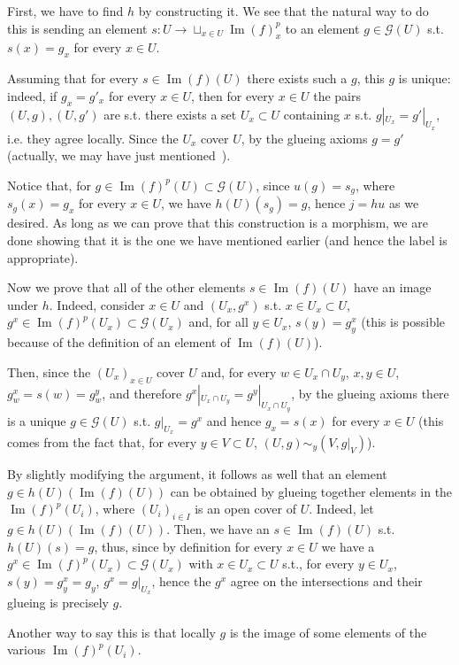 \documentclass{article}
\DeclareMathOperator{\Ima}{Im}
\begin{document}
First, we have to find $h$ by constructing it. We see that the natural way to do this is sending an element $s:U\rightarrow\sqcup_{x\in U} \Ima(f)^p_x$ to an element $g\in\mathcal{G}(U)$ s.t. $s(x)=g_x$ for every $x\in U$.

Assuming that for every $s\in\Ima(f)(U)$ there exists such a $g$, this $g$ is unique: indeed, if $g_x=g'_x$ for every $x\in U$, then for every $x\in U$ the pairs $(U,g), (U,g')$ are s.t. there exists a set $U_x\subset U$ containing $x$ s.t. $g|_{U_x}=g'|_{U_x}$, i.e. they agree locally. Since the $U_x$ cover $U$, by the glueing axioms $g=g'$ (actually, we may have just mentioned~\cite[ex. 4.6.21]{edix}).

Notice that, for $g\in\Ima(f)^p(U)\subset\mathcal{G}(U)$, since $u(g)=s_g$, where $s_g(x)=g_x$ for every $x\in U$, we have $h(U)(s_g)=g$, hence $j=hu$ as we desired. As long as we can prove that this construction is a morphism, we are done showing that it is the one we have mentioned earlier (and hence the label is appropriate).

Now we prove that all of the other elements $s\in\Ima(f)(U)$ have an image under $h$. Indeed, consider $x\in U$ and $(U_x,g^x)$ s.t. $x\in U_x\subset U$, $g^x\in\Ima(f)^p(U_x)\subset\mathcal{G}(U_x)$ and, for all $y\in U_x$, $s(y)=g^x_y$ (this is possible because of the definition of an element of $\Ima(f)(U)$).

Then, since the $(U_x)_{x\in U}$ cover $U$ and, for every $w\in U_x\cap U_y$, $x,y\in U$, $g^x_w=s(w)=g^y_w$, and therefore $g^x|_{U_x\cap U_y}=g^y|_{U_x\cap U_y}$, by the glueing axioms there is a unique $g\in\mathcal{G}(U)$ s.t. $g|_{U_x}=g^x$ and hence $g_x=s(x)$ for every $x\in U$ (this comes from the fact that, for every $y\in V\subset U$, $(U,g)\sim_y (V,g|_V)$).

By slightly modifying the argument, it follows as well that an element $g\in h(U)(\Ima(f)(U))$ can be obtained by glueing together elements in the $\Ima(f)^p(U_i)$, where $(U_i)_{i\in I}$ is an open cover of $U$. Indeed, let $g\in h(U)(\Ima(f)(U))$. Then, we have an $s\in\Ima(f)(U)$ s.t. $h(U)(s)=g$, thus, since by definition for every $x\in U$ we have a $g^x\in\Ima(f)^p(U_x)\subset\mathcal{G}(U_x)$ with $x\in U_x\subset U$ s.t., for every $y\in U_x$, $s(y)=g^x_y=g_y$, $g^x=g|_{U_x}$, hence the $g^x$ agree on the intersections and their glueing is precisely $g$.

Another way to say this is that locally $g$ is the image of some elements of the various $\Ima(f)^p(U_i)$.
\end{document}

